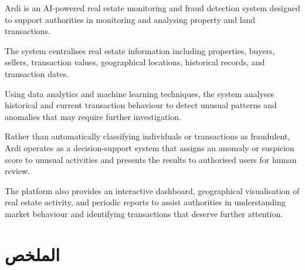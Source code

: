 \documentclass[12pt,a4paper,oneside]{report}
\begin{document}
\vspace{0.5cm}

Ardi is an AI-powered real estate monitoring and fraud detection
system designed to support authorities in monitoring and analysing
property and land transactions.

The system centralises real estate information including properties,
buyers, sellers, transaction values, geographical locations,
historical records, and transaction dates.

Using data analytics and machine learning techniques, the system
analyses historical and current transaction behaviour to detect
unusual patterns and anomalies that may require further investigation.

Rather than automatically classifying individuals or transactions as
fraudulent, Ardi operates as a decision-support system that assigns
an anomaly or suspicion score to unusual activities and presents the
results to authorised users for human review.

The platform also provides an interactive dashboard, geographical
visualisation of real estate activity, and periodic reports to assist
authorities in understanding market behaviour and identifying
transactions that deserve further attention.

\clearpage


\chapter*{\textarabic{الملخص}}

\end{document}
